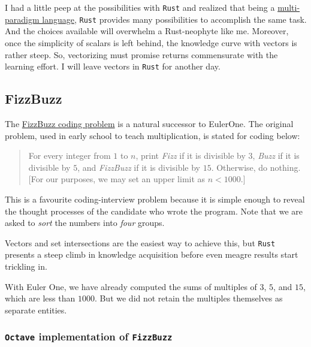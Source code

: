 \documentclass[
  a4paper,
]{article}
\begin{document}
I had a little peep at the possibilities with \texttt{Rust} and realized
that being a
\href{https://en.wikipedia.org/wiki/Comparison_of_multi-paradigm_programming_languages}{multi-paradigm
language}, \texttt{Rust} provides many possibilities to accomplish the
same task. And the choices available will overwhelm a Rust-neophyte like
me. Moreover, once the simplicity of scalars is left behind, the
knowledge curve with vectors is rather steep. So, vectorizing must
promise returns commensurate with the learning effort. I will leave
vectors in \texttt{Rust} for another day.

\hypertarget{fizzbuzz}{%
\subsection{FizzBuzz}\label{fizzbuzz}}

The \href{https://leetcode.com/problems/fizz-buzz/}{FizzBuzz coding
problem} is a natural successor to EulerOne. The original problem, used
in early school to teach multiplication, is stated for coding below:

\begin{quote}
For every integer from \(1\) to \(n\), print \emph{Fizz} if it is
divisible by \(3\), \emph{Buzz} if it is divisible by \(5\), and
\emph{FizzBuzz} if it is divisible by \(15\). Otherwise, do nothing.
{[}For our purposes, we may set an upper limit as \(n < 1000\).{]}
\end{quote}

This is a favourite coding-interview problem because it is simple enough
to reveal the thought processes of the candidate who wrote the program.
Note that we are asked to \emph{sort} the numbers into \emph{four}
groups.

Vectors and set intersections are the easiest way to achieve this, but
\texttt{Rust} presents a steep climb in knowledge acquisition before
even meagre results start trickling in.

With Euler One, we have already computed the sums of multiples of \(3\),
\(5\), and \(15\), which are less than \(1000\). But we did not retain
the multiples themselves as separate entities.

\hypertarget{octave-implementation-of-fizzbuzz}{%
\subsubsection{\texorpdfstring{\texttt{Octave} implementation of
\texttt{FizzBuzz}}{Octave implementation of FizzBuzz}}\label{octave-implementation-of-fizzbuzz}}
\end{document}
